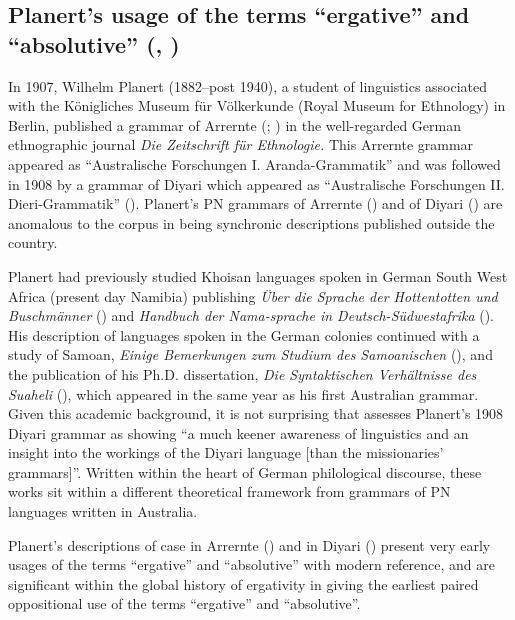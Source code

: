 \subsection{Planert’s usage of the terms “ergative” and “absolutive” (\citeyear{planert_australische_1907}, \citeyear{planert_australische_1908})}
\label{sec:key:2.6.1}

In 1907, Wilhelm Planert (1882–post 1940), a student of linguistics associated with the Königliches Museum für Völkerkunde (Royal Museum for Ethnology) in Berlin, published a grammar of Arrernte (\citeyear{planert_australische_1907}; ) in the well-regarded German ethnographic journal \textit{Die Zeitschrift für Ethnologie.} This Arrernte grammar appeared as “Australische Forschungen I. Aranda-Grammatik” and was followed in 1908 by a grammar of Diyari which appeared as “Australische Forschungen II. Dieri-Grammatik” (). Planert’s PN grammars of Arrernte (\citeyear{planert_australische_1907}) and of Diyari (\citeyear{planert_australische_1908}) are anomalous to the corpus in being synchronic descriptions published outside the country.

Planert had previously studied Khoisan languages spoken in German South West Africa (present day Namibia) publishing \textit{Über die Sprache der Hottentotten und Buschmänner} (\citealt{planert_1905}) and \textit{Handbuch der Nama-sprache in Deutsch-Südwestafrika} (\citealt{planert_1905}). His description of languages spoken in the German colonies continued with a study of Samoan, \textit{Einige Bemerkungen zum Studium des Samoanischen} (\citealt{planert_1906}), and the publication of his Ph.D. dissertation, \textit{Die Syntaktischen Verhältnisse des Suaheli} (\citeyear{planert_syntaktischen_1907}), which appeared in the same year as his first Australian grammar. Given this academic background, it is not surprising that \citet[245]{austin_grammar_2013} assesses Planert’s 1908 Diyari grammar as showing “a much keener awareness of linguistics and an insight into the workings of the Diyari language [than the missionaries' grammars]”. Written within the heart of German philological discourse, these works sit within a different theoretical framework from grammars of PN languages written in Australia. 

Planert’s descriptions of case in Arrernte (\citeyear[555]{planert_australische_1907}) and in Diyari (\citeyear[689]{planert_australische_1908}) present very early usages of the terms “ergative” and “absolutive” with modern reference, and are significant within the global history of ergativity in giving the earliest paired oppositional use of the terms “ergative” and “absolutive''.

